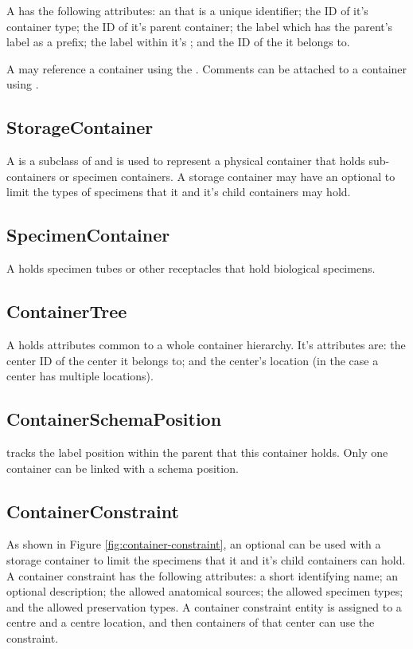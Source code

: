 A  has the following attributes: an
 that is a unique identifier; the ID of it's container
type; the ID of it's parent container; the label which has the parent's label
as a prefix; the label within it's ; and
the ID of the  it belongs to.

A  may reference a container using the
. Comments can be attached to a container using
.

\subsection*{StorageContainer}
A  is a subclass of  and is
used to represent a physical container that holds sub-containers or specimen
containers. A storage container may have an optional
 to limit the types of specimens that it and
it's child containers may hold.

\subsection*{SpecimenContainer}
A  holds specimen tubes or other receptacles that
hold biological specimens.

\subsection*{ContainerTree}
A  holds attributes common to a whole container
hierarchy. It's attributes are: the center ID of the center it belongs to; and
the center's location (in the case a center has multiple locations).

\subsection*{ContainerSchemaPosition}
 tracks the label position within the
parent that this container holds. Only one container can be linked with a
schema position.

\subsection*{ContainerConstraint}
As shown in Figure \ref{fig:container-constraint}, an optional
 can be used with a storage container to limit
the specimens that it and it's child containers can hold. A container
constraint has the following attributes: a short identifying name; an optional
description; the allowed anatomical sources; the allowed specimen types; and
the allowed preservation types. A container constraint entity is assigned to a
centre and a centre location, and then containers of that center can use the
constraint.

